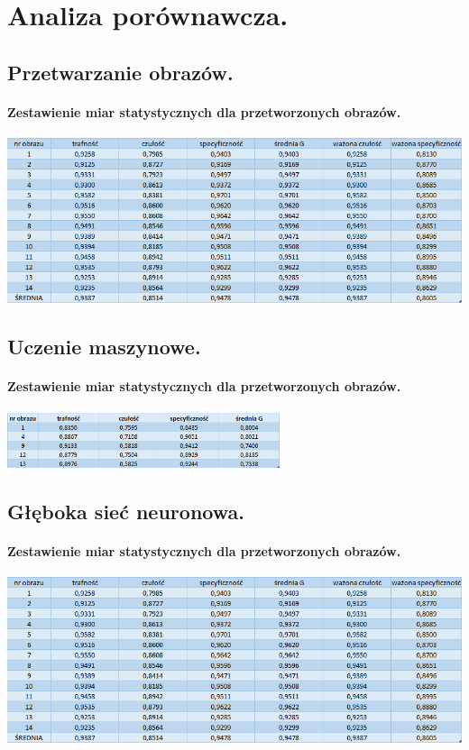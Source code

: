 \documentclass[a4paper, 11pt]{article}
\begin{document}
\newpage

\section{Analiza porównawcza.}
\subsection{Przetwarzanie obrazów.}

\paragraph{Zestawienie miar statystycznych dla przetworzonych obrazów.}
\begin{center}
	
		\includegraphics[width=\textwidth]{./processing/data.png}
		
\end{center}

\subsection{Uczenie maszynowe.}

\paragraph{Zestawienie miar statystycznych dla przetworzonych obrazów.}
\begin{center}
	
	\includegraphics[width=0.6\textwidth]{./ML/data.png}
	
\end{center}

\subsection{Głęboka sieć neuronowa.}

\paragraph{Zestawienie miar statystycznych dla przetworzonych obrazów.}
\begin{center}
	
	\includegraphics[width=\textwidth]{./processing/data.png}
	
\end{center}
\end{document}
